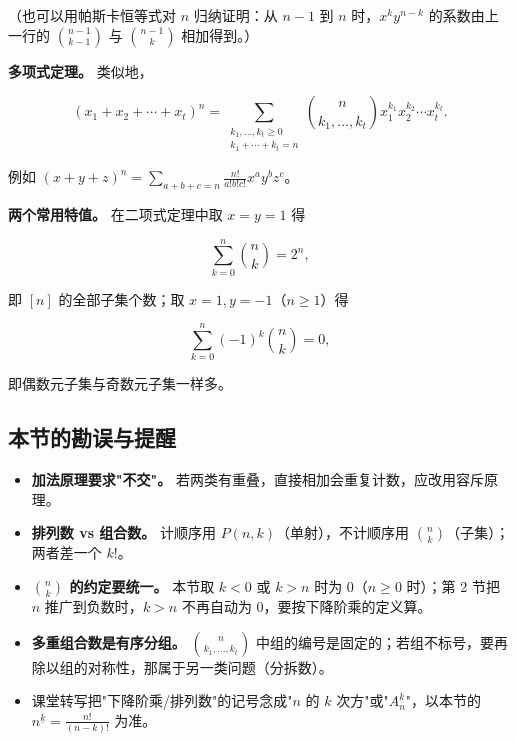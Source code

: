 （也可以用帕斯卡恒等式对 $n$ 归纳证明：从 $n-1$ 到 $n$ 时，$x^ky^{n-k}$ 的系数由上一行的 $\binom{n-1}{k-1}$ 与 $\binom{n-1}{k}$ 相加得到。）

\textbf{多项式定理。} 类似地，

\[
(x_1+x_2+\cdots+x_t)^n=\sum_{\substack{k_1,\dots,k_t\ge0\\ k_1+\cdots+k_t=n}}\binom{n}{k_1,\dots,k_t}x_1^{k_1}x_2^{k_2}\cdots x_t^{k_t}.
\]

例如 $(x+y+z)^n=\sum_{a+b+c=n}\frac{n!}{a!b!c!}x^ay^bz^c$。

\textbf{两个常用特值。} 在二项式定理中取 $x=y=1$ 得

\[
\sum_{k=0}^{n}\binom nk=2^n,
\]

即 $[n]$ 的全部子集个数；取 $x=1,y=-1$（$n\ge1$）得

\[
\sum_{k=0}^{n}(-1)^k\binom nk=0,
\]

即偶数元子集与奇数元子集一样多。

\subsection{本节的勘误与提醒}


\begin{itemize}
\item \textbf{加法原理要求"不交"。} 若两类有重叠，直接相加会重复计数，应改用容斥原理。
\item \textbf{排列数 vs 组合数。} 计顺序用 $P(n,k)$（单射），不计顺序用 $\binom nk$（子集）；两者差一个 $k!$。
\item \textbf{$\binom nk$ 的约定要统一。} 本节取 $k<0$ 或 $k>n$ 时为 $0$（$n\ge0$ 时）；第 2 节把 $n$ 推广到负数时，$k>n$ 不再自动为 $0$，要按下降阶乘的定义算。
\item \textbf{多重组合数是有序分组。} $\binom{n}{k_1,\dots,k_t}$ 中组的编号是固定的；若组不标号，要再除以组的对称性，那属于另一类问题（分拆数）。
\item 课堂转写把"下降阶乘/排列数"的记号念成"$n$ 的 $k$ 次方"或"$A_n^k$"，以本节的 $n^{\underline{k}}=\frac{n!}{(n-k)!}$ 为准。
\end{itemize}
